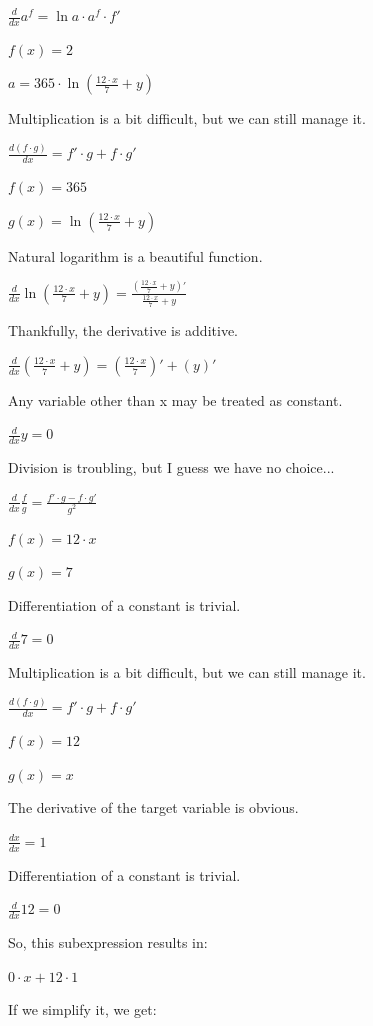 \documentclass[12pt]{article}
\begin{document}
\begin{fleqn}[\parindent]
$ \frac{d}{dx} a^f = \ln{a} \cdot a^f \cdot f' $\par
$ f(x) =  2  $\par
$ a =  365  \cdot \ln (\frac{ 12  \cdot  x }{ 7 } +  y ) $\par
Multiplication is a bit difficult, but we can still manage it.\par
$ \frac{d (f \cdot g)}{dx} = f' \cdot g + f \cdot g' $\par
$ f(x) =  365  $\par
$ g(x) = \ln (\frac{ 12  \cdot  x }{ 7 } +  y ) $\par
Natural logarithm is a beautiful function.\par
$ \frac{d}{dx} \ln (\frac{ 12  \cdot  x }{ 7 } +  y ) = \frac{(\frac{ 12  \cdot  x }{ 7 } +  y )'}{\frac{ 12  \cdot  x }{ 7 } +  y } $\par
Thankfully, the derivative is additive.\par
$ \frac{d}{dx} (\frac{ 12  \cdot  x }{ 7 } +  y ) = (\frac{ 12  \cdot  x }{ 7 })' + ( y )' $\par
Any variable other than x may be treated as constant.\par
$ \frac{d}{dx} y = 0 $\par
Division is troubling, but I guess we have no choice...\par
$ \frac{d}{dx} \frac{f}{g} = \frac{f' \cdot g - f \cdot g'}{g^2} $\par
$ f(x) =  12  \cdot  x  $\par
$ g(x) =  7  $\par
Differentiation of a constant is trivial.\par
$ \frac{d}{dx} 7 = 0 $\par
Multiplication is a bit difficult, but we can still manage it.\par
$ \frac{d (f \cdot g)}{dx} = f' \cdot g + f \cdot g' $\par
$ f(x) =  12  $\par
$ g(x) =  x  $\par
The derivative of the target variable is obvious.\par
$ \frac{dx}{dx} = 1 $\par
Differentiation of a constant is trivial.\par
$ \frac{d}{dx} 12 = 0 $\par
So, this subexpression results in:\par
$  0  \cdot  x  +  12  \cdot  1  $\par
If we simplify it, we get:\par

\end{fleqn}
\end{document}
